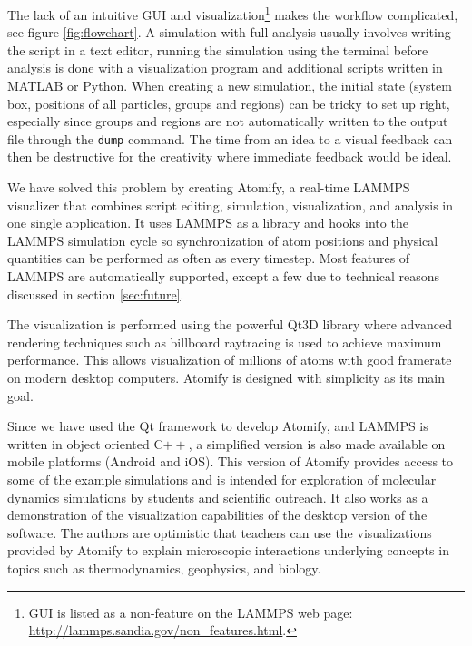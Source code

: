\documentclass[aps,pre,twocolumn,letterpaper,floatfix,nofootinbib]{revtex4}
\newcommand*{\cpp}{C\ensuremath{++}\xspace}
\newcommand{\code}[1]{\colorbox{light-gray}{\color{RawSienna}\texttt{#1}}}
\begin{document}
The lack of an intuitive GUI and visualization\footnote{GUI is listed as a non-feature on the LAMMPS web page: \url{http://lammps.sandia.gov/non_features.html}.}
makes the workflow complicated, see figure \ref{fig:flowchart}.
A simulation with full analysis usually involves writing the script in a text editor, running the simulation using the terminal before analysis is done with a visualization program and additional scripts written in MATLAB or Python.
When creating a new simulation, the initial state (system box, positions of all particles, groups and regions) can be tricky to set up right, especially since groups and regions are not automatically written to the output file through the \code{dump} command.
The time from an idea to a visual feedback can then be destructive for the creativity where immediate feedback would be ideal.

We have solved this problem by creating Atomify, a real-time LAMMPS visualizer that combines script editing, simulation, visualization, and analysis in one single application.
It uses LAMMPS as a library and hooks into the LAMMPS simulation cycle so synchronization of atom positions and physical quantities can be performed as often as every timestep.
Most features of LAMMPS are automatically supported, except a few due to technical reasons discussed in section \ref{sec:future}.

The visualization is performed using the powerful Qt3D library where advanced rendering techniques such as billboard raytracing is used to achieve maximum performance.
This allows visualization of millions of atoms with good framerate on modern desktop computers.
Atomify is designed with simplicity as its main goal.

Since we have used the Qt framework to develop Atomify, and LAMMPS is written in object oriented \cpp, a simplified version is also made available on mobile platforms (Android and iOS).
This version of Atomify provides access to some of the example simulations and is intended for exploration of molecular dynamics simulations by students and scientific outreach.
It also works as a demonstration of the visualization capabilities of the desktop version of the software.
The authors are optimistic that teachers can use the visualizations provided by
Atomify to explain microscopic interactions underlying concepts in topics such
as thermodynamics, geophysics, and biology.
\end{document}
